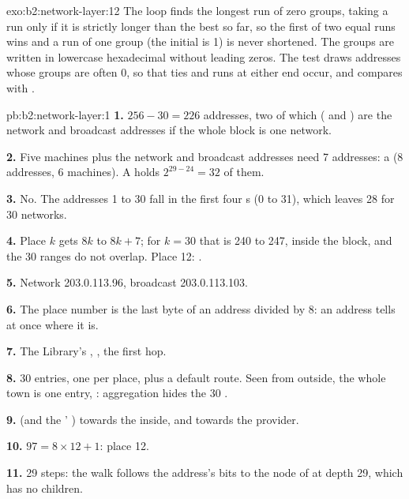 \begin{solution}{exo:b2:network-layer:12}
The loop finds the longest run of zero groups, taking a run only if it is strictly longer than the best so far, so the
first of two equal runs wins and a run of one group (the initial  is 1) is never shortened. The
groups are written in lowercase hexadecimal without leading zeros. The test draws addresses whose groups are often 0,
so that ties and runs at either end occur, and compares with .
\end{solution}

\begin{solution}{pb:b2:network-layer:1}
\textbf{1.} $256 - 30 = 226$ addresses, two of which ( and ) are the network and broadcast
addresses if the whole block is one network.

\textbf{2.} Five machines plus the network and broadcast addresses need 7 addresses: a  (8 addresses, 6
machines). A  holds $2^{29-24} = 32$ of them.

\textbf{3.} No. The  addresses 1 to 30 fall in the first four s (0 to 31), which leaves 28 for 30
networks.

\textbf{4.} Place $k$ gets $8k$ to $8k + 7$; for $k = 30$ that is 240 to 247, inside the block, and the 30 ranges do
not overlap. Place 12: .

\textbf{5.} Network 203.0.113.96, broadcast 203.0.113.103.

\textbf{6.} The place number is the last byte of an address divided by 8: an address tells at once where it is.

\textbf{7.} The Library's , , the first hop.

\textbf{8.} 30 entries, one per place, plus a default route. Seen from outside, the whole town is one entry,
: aggregation hides the 30 .

\textbf{9.}  (and the ' ) towards the inside, and 
towards the provider.

\textbf{10.} $97 = 8 \times 12 + 1$: place 12.

\textbf{11.} 29 steps: the walk follows the address's bits to the node of  at depth 29, which
has no children.


\end{solution}
